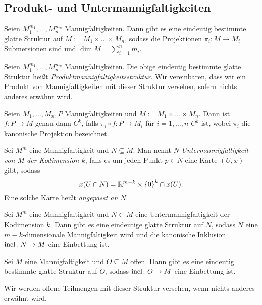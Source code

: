 \subsection{Produkt- und Untermannigfaltigkeiten}
\label{sec:prumfk}

\begin{proposition}
  Seien $M_1^{m_1},\dots,M_n^{m_n}$ Mannigfaltigkeiten. Dann gibt es
  eine eindeutig bestimmte glatte Struktur auf $M :=
  M_1\times\dots\times M_n$, sodass die Projektionen $\pi_i \colon M
  \to M_i$ Submersionen sind und $\dim M = \sum_{i=1}^n m_i$.
\end{proposition}

\begin{definition}
  Seien $M_1^{m_1},\dots,M_n^{m_n}$ Mannigfaltigkeiten. Die obige
  eindeutig bestimmte glatte  Struktur heißt
  \emph{Produktmannigfaltigkeitsstruktur}. Wir vereinbaren, dass wir
  ein Produkt von Mannigfaltigkeiten mit dieser Struktur versehen,
  sofern nichts anderes erwähnt wird.
\end{definition}

\begin{proposition}
  Seien $M_1,\dots,M_n,P$ Mannigfaltigkeiten und $M :=
  M_1\times\dots\times M_n$. Dann ist $f\colon P \to M$ genau dann
  $C^k$, falls $\pi_i\circ f \colon P \to M_i$ für $i=1,\dots,n$ $C^k$
  ist, wobei $\pi_i$ die kanonische Projektion bezeichnet.
\end{proposition}

\begin{definition}
  Sei $M^m$ eine Mannigfaltigkeit und $N \subseteq M$. 
  Man nennt $N$ \emph{Untermannigfaltigkeit von $M$ der Kodimension
    $k$}, falls es um jeden Punkt $p\in N$ eine Karte $(U,x)$ gibt, sodass
  \begin{equation*}
    x(U\cap N) = \mathbb{R}^{m-k}\times\left\lbrace 0 \right\rbrace^{k} \cap x(U).
  \end{equation*}
  Eine solche Karte heißt \emph{angepasst an $N$}.
\end{definition}

\begin{proposition}
  Sei $M^m$ eine Mannigfaltigkeit und $N\subset M$ eine
  Untermannigfaltigkeit der Kodimension $k$. Dann gibt es eine
  eindeutige glatte Struktur auf $N$, sodass $N$ eine
  $m-k$-dimensionale Mannigfaltigkeit wird und die kanonische
  Inklusion $\operatorname{incl}\colon N \to M$ eine Einbettung ist.
\end{proposition}

\begin{korollar}
  Sei $M$ eine Mannigfaltigkeit und $O\subseteq M$ offen. Dann gibt es
  eine eindeutig bestimmte glatte Struktur auf $O$, sodass
  $\operatorname{incl}\colon O \to M$ eine Einbettung ist.

  Wir werden offene Teilmengen mit dieser Struktur versehen, wenn
  nichts anderes erwähnt wird.
\end{korollar}

